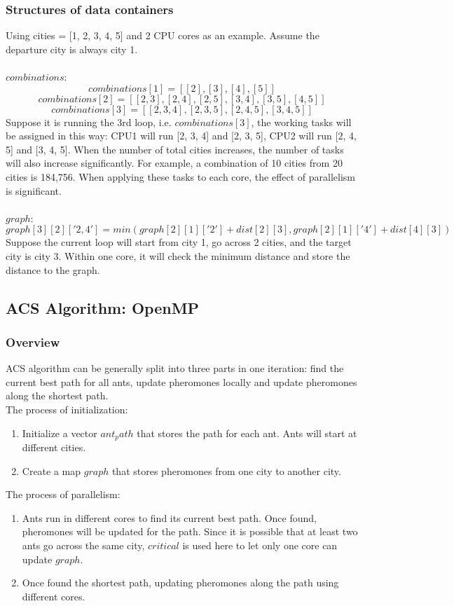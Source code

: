 \documentclass{article}
\begin{document}
\subsubsection{Structures of data containers}
    Using cities = [1, 2, 3, 4, 5] and 2 CPU cores as an example. Assume the departure city is always city 1.\\\\
    $combinations$:
        $$combinations[1] = [[2], [3], [4], [5]]$$
        $$combinations[2] = [[2, 3], [2, 4], [2, 5], [3, 4], [3, 5], [4, 5]]$$
        $$combinations[3] = [[2, 3, 4], [2, 3, 5], [2, 4, 5], [3, 4, 5]]$$
    Suppose it is running the 3rd loop, i.e. $combinations[3]$, the working tasks will be assigned in this way: CPU1 will run [2, 3, 4] and [2, 3, 5], CPU2 will run [2, 4, 5] and [3, 4, 5]. When the number of total cities increases, the number of tasks will also increase significantly. For example, a combination of 10 cities from 20 cities is 184,756. When applying these tasks to each core, the effect of parallelism is significant.\\\\
    $graph$:
        $$graph[3][2]['2,4'] = min(graph[2][1]['2'] + dist[2][3], graph[2][1]['4'] + dist[4][3])$$
    Suppose the current loop will start from city 1, go across 2 cities, and the target city is city 3. Within one core, it will check the minimum distance and store the distance to the graph.
    

\subsection{ACS Algorithm: OpenMP}
\subsubsection{Overview}
    ACS algorithm can be generally split into three parts in one iteration: find the current best path for all ants, update pheromones locally and update pheromones along the shortest path.\\
    The process of initialization:
    \begin{enumerate}
        \item Initialize a vector $ant_path$ that stores the path for each ant. Ants will start at
        different cities.
        \item Create a map $graph$ that stores pheromones from one city to another city.
    \end{enumerate}
    The process of parallelism:
    \begin{enumerate}
        \item Ants run in different cores to find its current best path. Once found, pheromones will be updated for the path. Since it is possible that at least two ants go across the same city, $critical$ is used here to let only one core can update $graph$.
        \item Once found the shortest path, updating pheromones along the path using different cores.
    \end{enumerate}
\end{document}
